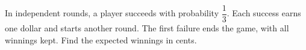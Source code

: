 In independent rounds, a player succeeds with probability $\dfrac{1}{3}$. Each success earns one dollar and starts another round. The first failure ends the game, with all winnings kept. Find the expected winnings in cents.
